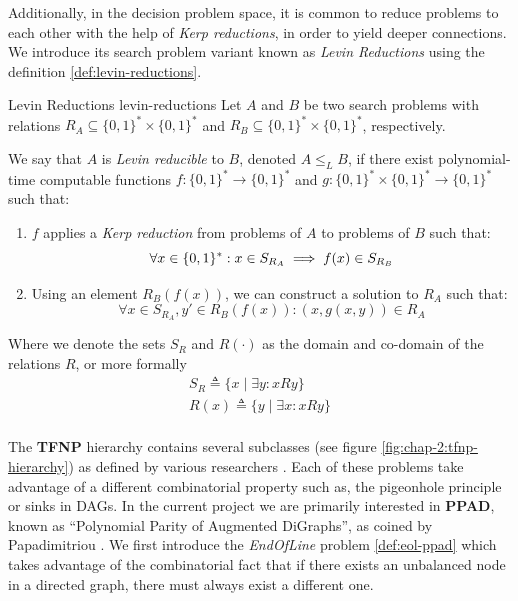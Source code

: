 Additionally, in the decision problem space, it is common to reduce problems to each other
with the help of \textit{Kerp reductions}, in order to yield
deeper connections. We introduce its
search problem variant known as \textit{Levin Reductions} using the definition
\ref{def:levin-reductions}.

\begin{definitionbox}{Levin Reductions \cite{arora_ComputationalComplexityModern_2009}}{levin-reductions}
    Let $A$ and $B$ be two search problems with relations $R_A \subseteq \{0,1\}^* \times \{0,1\}^*$ and $R_B \subseteq \{0,1\}^* \times \{0,1\}^*$, respectively.

    We say that $A$ is \textit{Levin reducible} to $B$, denoted $A \leq_L B$, if there exist polynomial-time computable functions $f: \{0,1\}^* \to \{0,1\}^*$ and $g: \{0,1\}^* \times \{0,1\}^* \to \{0,1\}^*$ such that:
    \begin{enumerate}
        \item $f$ applies a \textit{Kerp reduction} from problems of $A$ to problems of $B$ such that:
              $$
                  \forall x \in \{0,1\}^*: x \in  S_{R_A} \implies f(x) \in S_{R_B}\\
              $$
        \item Using an element $R_B(f(x))$, we can construct a solution to $R_A$ such that:
              $$
                  \forall x \in S_{R_A}, y' \in R_B(f(x)): (x,g(x,y)) \in R_A
              $$
    \end{enumerate}

    Where we denote the sets $S_R$ and $R(\cdot)$ as
    the domain and co-domain of the relations $R$, or more formally
    \begin{gather*}
        S_R \triangleq \{x \mid \exists y : xRy\} \\
        R(x) \triangleq \{y \mid \exists x : xRy\} \\
    \end{gather*}

\end{definitionbox}

The \textbf{TFNP} hierarchy contains several subclasses (see figure \ref{fig:chap-2:tfnp-hierarchy}) as defined by various researchers
\cite{papadimitriou_ComplexityParityArgument_1994,johnson_HowEasyLocal_1988,daskalakis_ContinuousLocalSearch_2011,fearnley_CLSNewProblems_2017}.
Each of these problems take advantage of a different combinatorial property such as,
the pigeonhole principle or sinks in DAGs.
In the current project we are primarily interested
in \textbf{PPAD}, known as ``Polynomial Parity of Augmented DiGraphs'', as coined by Papadimitriou \cite{papadimitriou_ComplexityParityArgument_1994}.
We first introduce the \textit{EndOfLine} problem \ref{def:eol-ppad}
which takes advantage of the combinatorial fact that if there exists an unbalanced node in a directed graph,
there must always exist a different one.

